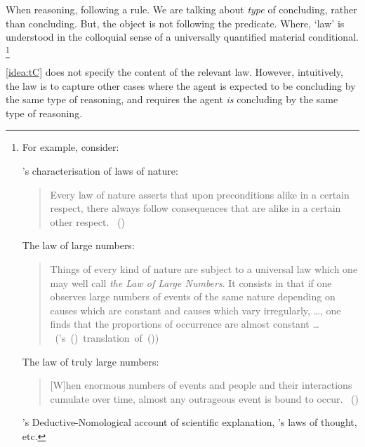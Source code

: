 \begin{note}
{    When reasoning, following a rule.
    We are talking about \emph{type} of concluding, rather than concluding.
    But, the object is not following the predicate.
  }
  Where, `law' is understood in the colloquial sense of a universally quantified material conditional.%
  \footnote{
    For example, consider:

    \citeauthor{Helmholtz:1977aa}'s characterisation of laws of nature:%
    \begin{quote}
      \nocite{Wilson:2006aa}
      Every law of nature asserts that upon preconditions alike in a certain respect, there always follow consequences that are alike in a certain other respect.%
      \mbox{ }\hfill\mbox{(\citeyear[122]{Helmholtz:1977aa})}
    \end{quote}

    The law of large numbers:
    \begin{quote}
      Things of every kind of nature are subject to a universal law which one may well call \emph{the Law of Large Numbers}.
      It consists in that if one observes large numbers of events of the same nature depending on causes which are constant and causes which vary irregularly, \dots, one finds that the proportions of occurrence are almost constant \dots\newline
      \mbox{ }\hfill\mbox{(\citeauthor{Seneta:2013aa}'s (\citeyear[9--10]{Seneta:2013aa}) translation of (\cite[7]{Poisson:1837aa}))}
    \end{quote}

    The law of truly large numbers:
    \begin{quote}
      [W]hen enormous numbers of events and people and their interactions cumulate over time, almost any outrageous event is bound to occur.%
      \mbox{ }\hfill\mbox{(\cite[853]{Diaconis:1989aa})}
    \end{quote}
    \citeauthor{Hempel:1965aa}'s Deductive-Nomological account of scientific explanation, \citeauthor{Boole:1854aa}'s laws of thought, etc.
  }

  \autoref{idea:tC} does not specify the content of the relevant law.
  However, intuitively, the law is to capture other cases where the agent is expected to be concluding by the same type of reasoning, and requires the agent \emph{is} concluding by the same type of reasoning.
\end{note}


